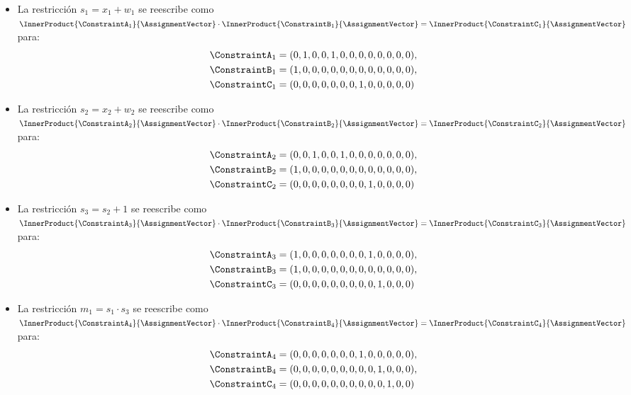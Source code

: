 \begin{itemize}
	\item La restricción $s_1 = x_1 + w_1$ se reescribe como $\InnerProduct{\ConstraintA_1}{\AssignmentVector} \cdot \InnerProduct{\ConstraintB_1}{\AssignmentVector} = \InnerProduct{\ConstraintC_1}{\AssignmentVector}$ para:
	$$\begin{aligned}
		\ConstraintA_1 &= (0, 1, 0, 0, 1, 0, 0, 0, 0, 0, 0, 0, 0), \\
		\ConstraintB_1 &= (1, 0, 0, 0, 0, 0, 0, 0, 0, 0, 0, 0, 0), \\
		\ConstraintC_1 &= (0, 0, 0, 0, 0, 0, 0, 1, 0, 0, 0, 0, 0)
	\end{aligned}$$
	\item La restricción $s_2 = x_2 + w_2$ se reescribe como $\InnerProduct{\ConstraintA_2}{\AssignmentVector} \cdot \InnerProduct{\ConstraintB_2}{\AssignmentVector} = \InnerProduct{\ConstraintC_2}{\AssignmentVector}$ para:
	$$\begin{aligned}
		\ConstraintA_2 &= (0, 0, 1, 0, 0, 1, 0, 0, 0, 0, 0, 0, 0), \\
		\ConstraintB_2 &= (1, 0, 0, 0, 0, 0, 0, 0, 0, 0, 0, 0, 0), \\
		\ConstraintC_2 &= (0, 0, 0, 0, 0, 0, 0, 0, 1, 0, 0, 0, 0)
	\end{aligned}$$
	\item La restricción $s_3 = s_2 + 1$ se reescribe como $\InnerProduct{\ConstraintA_3}{\AssignmentVector} \cdot \InnerProduct{\ConstraintB_3}{\AssignmentVector} = \InnerProduct{\ConstraintC_3}{\AssignmentVector}$ para:
	$$\begin{aligned}
		\ConstraintA_3 &= (1, 0, 0, 0, 0, 0, 0, 0, 1, 0, 0, 0, 0), \\
		\ConstraintB_3 &= (1, 0, 0, 0, 0, 0, 0, 0, 0, 0, 0, 0, 0), \\
		\ConstraintC_3 &= (0, 0, 0, 0, 0, 0, 0, 0, 0, 1, 0, 0, 0)
	\end{aligned}$$
	\item La restricción $m_1 = s_1 \cdot s_3$ se reescribe como $\InnerProduct{\ConstraintA_4}{\AssignmentVector} \cdot \InnerProduct{\ConstraintB_4}{\AssignmentVector} = \InnerProduct{\ConstraintC_4}{\AssignmentVector}$ para:
	$$\begin{aligned}
		\ConstraintA_4 &= (0, 0, 0, 0, 0, 0, 0, 1, 0, 0, 0, 0, 0), \\
		\ConstraintB_4 &= (0, 0, 0, 0, 0, 0, 0, 0, 0, 1, 0, 0, 0), \\
		\ConstraintC_4 &= (0, 0, 0, 0, 0, 0, 0, 0, 0, 0, 1, 0, 0)
	\end{aligned}$$

\end{itemize}
